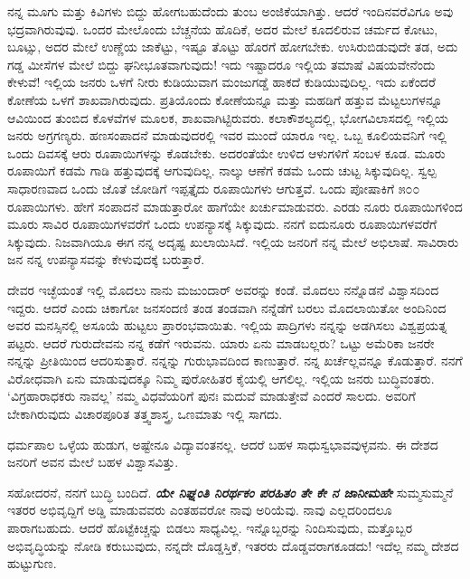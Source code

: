 ನನ್ನ ಮೂಗು ಮತ್ತು ಕಿವಿಗಳು ಬಿದ್ದು ಹೋಗಬಹುದೆಂದು ತುಂಬ ಅಂಜಿಕೆಯಾಗಿತ್ತು. ಆದರೆ ಇಂದಿನವರೆವಿಗೂ ಅವು ಭದ್ರವಾಗಿರುವುವು. ಒಂದರ ಮೇಲೊಂದು ಬೆಚ್ಚನೆಯ ಹೊದಿಕೆ, ಅದರ ಮೇಲೆ ಕೂದಲಿರುವ ಚರ್ಮದ ಕೋಟು, ಬೂಟ್ಸು, ಅದರ ಮೇಲೆ ಉಣ್ಣೆಯ ಜಾಕೆಟ್ಟು, ಇಷ್ಟೂ ತೊಟ್ಟು ಹೊರಗೆ ಹೋಗಬೇಕು. ಉಸಿರುಬಿಡುವುದೇ ತಡ, ಅದು ಗಡ್ಡ ಮೀಸೆಗಳ ಮೇಲೆ ಬಿದ್ದು ಘನೀಭೂತವಾಗುವುದು! ಇದು ಇಷ್ಟಾದರೂ ಇಲ್ಲಿಯ ತಮಾಷೆ ವಿಷಯವೇನೆಂದು ಕೇಳುವೆ! ಇಲ್ಲಿಯ ಜನರು ಒಳಗೆ ನೀರು ಕುಡಿಯುವಾಗ ಮಂಜುಗಡ್ಡೆ ಹಾಕದೆ ಕುಡಿಯುವುದಿಲ್ಲ. ಇದು ಏಕೆಂದರೆ ಕೋಣೆಯ ಒಳಗೆ ಶಾಖವಾಗಿರುವುದು. ಪ್ರತಿಯೊಂದು ಕೋಣೆಯನ್ನೂ ಮತ್ತು ಮಹಡಿಗೆ ಹತ್ತುವ ಮೆಟ್ಟಲುಗಳನ್ನೂ ಆವಿಯಿಂದ ತುಂಬಿದ ಕೊಳವೆಗಳ ಮೂಲಕ, ಶಾಖವಾಗಿಟ್ಟಿರುವರು. ಕಲಾಕೌಶಲ್ಯದಲ್ಲಿ, ಭೋಗವಿಲಾಸದಲ್ಲಿ ಇಲ್ಲಿಯ ಜನರು ಅಗ್ರಗಣ್ಯರು. ಹಣಸಂಪಾದನೆ ಮಾಡುವುದರಲ್ಲಿ ಇವರ ಮುಂದೆ ಯಾರೂ ಇಲ್ಲ. ಒಬ್ಬ ಕೂಲಿಯವನಿಗೆ ಇಲ್ಲಿ ಒಂದು ದಿವಸಕ್ಕೆ ಆರು ರೂಪಾಯಿಗಳನ್ನು ಕೊಡಬೇಕು. ಅದರಂತೆಯೇ ಉಳಿದ ಆಳುಗಳಿಗೆ ಸಂಬಳ ಕೂಡ. ಮೂರು ರೂಪಾಯಿಗೆ ಕಡಮೆ ಗಾಡಿ ಹತ್ತುವುದಕ್ಕೆ ಆಗುವುದಿಲ್ಲ. ನಾಲ್ಕು ಆಣೆಗೆ ಕಡಮೆ ಒಂದು ಚುಟ್ಟ ಸಿಕ್ಕುವುದಿಲ್ಲ. ಸ್ವಲ್ಪ ಸಾಧಾರಣವಾದ ಒಂದು ಜೊತೆ ಜೋಡಿಗೆ ಇಪ್ಪತ್ತೈದು ರೂಪಾಯಿಗಳು ಆಗುತ್ತವೆ. ಒಂದು ಪೋಷಾಕಿಗೆ ೫೦೦ ರೂಪಾಯಿಗಳು. ಹೇಗೆ ಸಂಪಾದನೆ ಮಾಡುತ್ತಾರೋ ಹಾಗೆಯೇ ಖರ್ಚುಮಾಡುವರು. ಎರಡು ನೂರು ರೂಪಾಯಿಗಳಿಂದ ಮೂರು ಸಾವಿರ ರೂಪಾಯಿಗಳವರೆಗೆ ಒಂದು ಉಪನ್ಯಾಸಕ್ಕೆ ಸಿಕ್ಕುವುದು. ನನಗೆ ಐದುನೂರು ರೂಪಾಯಿಗಳವರೆಗೆ ಸಿಕ್ಕುವುದು. ನಿಜವಾಗಿಯೂ ಈಗ ನನ್ನ ಅದೃಷ್ಟ ಖುಲಾಯಿಸಿದೆ. ಇಲ್ಲಿಯ ಜನರಿಗೆ ನನ್ನ ಮೇಲೆ ಅಭಿಲಾಷೆ. ಸಾವಿರಾರು ಜನ ನನ್ನ ಉಪನ್ಯಾಸವನ್ನು ಕೇಳುವುದಕ್ಕೆ ಬರುತ್ತಾರೆ.

ದೇವರ ಇಚ್ಛೆಯಂತೆ ಇಲ್ಲಿ ಮೊದಲು ನಾನು ಮಜುಂದಾರ್ ಅವರನ್ನು ಕಂಡೆ. ಮೊದಲು ನನ್ನೊಡನೆ ವಿಶ್ವಾಸದಿಂದ ಇದ್ದರು. ಆದರೆ ಎಂದು ಚಿಕಾಗೋ ಜನಸಂದಣಿ ತಂಡ ತಂಡವಾಗಿ ನನ್ನೆಡೆಗೆ ಬರಲು ಮೊದಲಾಯಿತೋ ಅಂದಿನಿಂದ ಅವರ ಮನಸ್ಸಿನಲ್ಲಿ ಅಸೂಯೆ ಹುಟ್ಟಲು ಪ್ರಾರಂಭವಾಯಿತು. ಇಲ್ಲಿಯ ಪಾದ್ರಿಗಳು ನನ್ನನ್ನು ಅಡಗಿಸಲು ವಿಶ್ವಪ್ರಯತ್ನ ಪಟ್ಟರು. ಆದರೆ ಗುರುದೇವನು ನನ್ನ ಕಡೆಗೆ ಇರುವನು. ಯಾರು ಏನು ಮಾಡಬಲ್ಲರು? ಒಟ್ಟು ಅಮೆರಿಕಾ ಜನರೇ ನನ್ನನ್ನು ಪ್ರೀತಿಯಿಂದ ಆದರಿಸುತ್ತಾರೆ. ನನ್ನನ್ನು ಗುರುಭಾವದಿಂದ ಕಾಣುತ್ತಾರೆ. ನನ್ನ ಖರ್ಚೆಲ್ಲವನ್ನೂ ಕೊಡುತ್ತಾರೆ. ನನಗೆ ವಿರೋಧವಾಗಿ ಏನು ಮಾಡುವುದಕ್ಕೂ ನಿಮ್ಮ ಪುರೋಹಿತರ ಕೈಯಲ್ಲಿ ಆಗಲಿಲ್ಲ. ಇಲ್ಲಿಯ ಜನರು ಬುದ್ಧಿ\break ವಂತರು. ‘ವಿಗ್ರಹಾರಾಧಕರು ನಾವಲ್ಲ’ ನಮ್ಮ ವಿಧವೆಯರಿಗೆ ಪುನಃ ಮದುವೆ ಮಾಡುತ್ತೇವೆ ಎಂದರೆ ಸಾಲದು. ಅವರಿಗೆ ಬೇಕಾಗಿರುವುದು ವಿಚಾರಪೂರಿತ ತತ್ತ್ವಶಾಸ್ತ್ರ, ಒಣಮಾತು ಇಲ್ಲಿ ಸಾಗದು.

ಧರ್ಮಪಾಲ ಒಳ್ಳೆಯ ಹುಡುಗ, ಅಷ್ಟೇನೂ ವಿದ್ಯಾವಂತನಲ್ಲ. ಆದರೆ ಬಹಳ ಸಾಧುಸ್ವಭಾವವುಳ್ಳವನು. ಈ ದೇಶದ ಜನರಿಗೆ ಅವನ ಮೇಲೆ ಬಹಳ ವಿಶ್ವಾಸವಿತ್ತು.

ಸಹೋದರನೆ, ನನಗೆ ಬುದ್ಧಿ ಬಂದಿದೆ. \textbf{\textit{ಯೇ ನಿಘ್ನಂತಿ ನಿರರ್ಥಕಂ ಪರಹಿತಂ ತೇ ಕೇ ನ ಜಾನೀಮಹೇ}} ಸುಮ್ಮಸುಮ್ಮನೆ ಇತರರ ಅಭಿವೃದ್ದಿಗೆ ಅಡ್ಡಿ ಮಾಡುವವರು ಎಂತಹವರೋ ನಾವು ಅರಿಯೆವು. ನಾವು ಎಲ್ಲದರಿಂದಲೂ ಪಾರಾಗಬಹುದು. ಆದರೆ ಹೊಟ್ಟೆಕಿಚ್ಚನ್ನು ಬಿಡಲು ಸಾಧ್ಯವಿಲ್ಲ. ಇನ್ನೊಬ್ಬರನ್ನು ನಿಂದಿಸುವುದು, ಮತ್ತೊಬ್ಬರ ಅಭಿವೃದ್ಧಿಯನ್ನು ನೋಡಿ ಕರುಬುವುದು, ನನ್ನದೇ ದೊಡ್ಡಸ್ತಿಕೆ, ಇತರರು ದೊಡ್ಡವರಾಗಕೂಡದು! ಇದೆಲ್ಲ ನಮ್ಮ ದೇಶದ ಹುಟ್ಟುಗುಣ.

